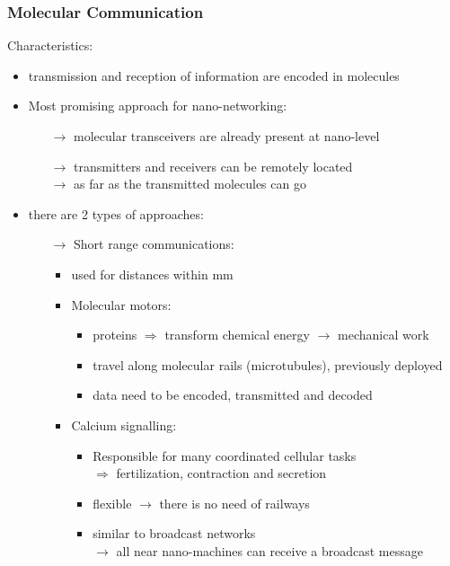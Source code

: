 \subsubsection{Molecular Communication}
Characteristics:
\begin{itemize}
    \item transmission and reception
    of information are encoded in molecules
    \item Most promising approach for nano-networking:
    \begin{itemize}
        \item[$\rightarrow$] molecular transceivers are already present at nano-level
        \item[$\rightarrow$] transmitters and receivers can be remotely located\\
        $\rightarrow$ as far as the transmitted molecules can go
    \end{itemize}
    \item there are 2 types of approaches:
    \begin{itemize}
        \item[$\rightarrow$] Short range communications:
        \begin{itemize}
            \item used for distances within mm
            \item Molecular motors:
            \begin{itemize}
                \item proteins $\Rightarrow$ transform
                chemical energy $\rightarrow$ mechanical work
                \item travel along molecular rails (microtubules), previously deployed
                \item data need to be encoded, transmitted and decoded
            \end{itemize}
            \item Calcium signalling:
            \begin{itemize}
                \item Responsible for many coordinated cellular tasks\\
                $\Rightarrow$ fertilization, contraction and secretion
                \item flexible $\rightarrow$ there is no need of railways
                \item similar to broadcast networks\\
                $\rightarrow$ all near nano-machines can receive a broadcast message

\end{itemize}
\end{itemize}
\end{itemize}
\end{itemize}
